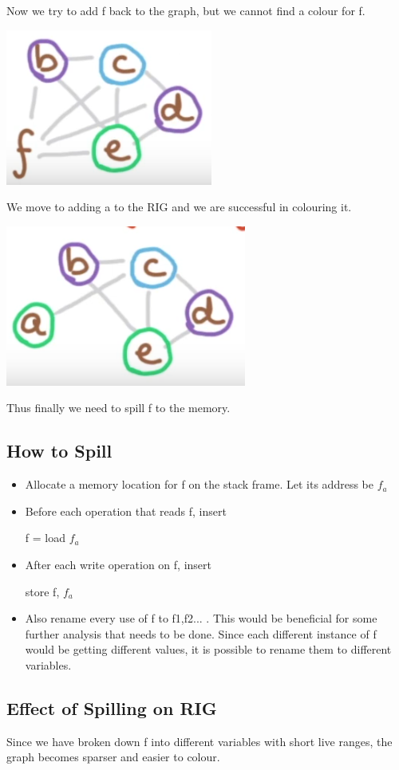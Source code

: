 Now we try to add f back to the graph, but we cannot find a colour for f.
\begin{center}
    \includegraphics[scale=0.30]{images/86_add_f.png}
\end{center}
We move to adding a to the RIG and we are successful in colouring it.
\begin{center}
    \includegraphics[scale=0.30]{images/86_add_a.png}
\end{center}
Thus finally we need to spill f to the memory.
\subsection{How to Spill}
\begin{itemize}
    \item Allocate a memory location for f on the stack frame. Let its address be $f_a$
    \item Before each operation that reads f, insert
        \begin{center}
            f = load $f_a$
        \end{center}
    \item After each write operation on f, insert
        \begin{center}
            store f, $f_a$
        \end{center}
    \item Also rename every use of f to f1,f2... . This would be beneficial for some further analysis that needs to be done. Since each different instance of f would be getting different values, it is possible to rename them to different variables.
\end{itemize}
\subsection{Effect of Spilling on RIG}
Since we have broken down f into different variables with short live ranges, the graph becomes sparser and easier to colour.
